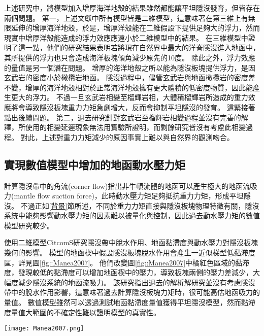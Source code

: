 上述研究中，將模型加入增厚海洋地殼的結果雖然都能讓平坦隱沒發育，但皆存在兩個問題。
第一，上述文獻中所有模型皆是二維模型，這意味著在第三維上有無限延伸的增厚海洋地殼，於是，增厚洋殼能在二維假設下提供足夠大的浮力，然而現實中增厚洋殼能造成的浮力效應應遠小於二維模型中的結果。
\citealp{florez2019impact}在三維模型中證明了這一點，他們的研究結果表明若將現在自然界中最大的洋脊隱沒進入地函中，其所提供的浮力也只會造成海洋板塊傾角減少原先的10度。
除此之外，浮力效應的量值是另一個潛在問題。
增厚的海洋地殼之所以能為隱沒板塊提供浮力，是因玄武岩的密度小於橄欖岩地函。
隱沒過程中，儘管玄武岩與地函橄欖岩的密度差不變，增厚的海洋地殼相對於正常海洋地殼擁有更大體積的低密度物質，因此能產生更大的浮力。
不過一旦玄武岩相變至榴輝岩相，大體積榴輝岩所造成的重力效應將會導致隱沒板塊重力力矩急劇增大，反而會抑制平坦隱沒的發育。
這緊接著點出後續問題。
第二，過去研究針對玄武岩至榴輝岩相變過程並沒有完善的解釋，\citealp{van2002role}所使用的相變延遲現象無法用實驗所證明，而剩餘研究皆沒有考慮此相變過程。
對此，上述對重力力矩減少的原因事實上難以與自然界的觀測吻合。


\subsection{實現數值模型中增加的地函動水壓力矩}
\citealp{tovish1978mantle}計算隱沒帶中的角流(corner flow)指出非牛頓流體的地函可以產生極大的地函流吸力(mantle flow suction force)，此時動水壓力矩足夠抵抗重力力矩，形成平坦隱沒。
不過正如\ref{背景}節所述，不同於重力力矩直接與隱沒板塊物理特徵有關，隱沒系統中能夠影響動水壓力矩的因素難以被量化與控制，因此過去動水壓力矩的數值模型研究較少。

\citealp{Manea2007}使用二維模型CitcomS研究隱沒帶中脫水作用、地函黏滯度與動水壓力對隱沒板塊幾何的影響。
模型的地函楔中假設隱沒板塊脫水作用會產生一近似梯型低黏滯度區，詳見圖\ref{fig::Manea2007}。
他們改變圖\ref{fig::Manea2007}中橘紅色區域的黏滯度，發現較低的黏滯度可以增加地函楔中的壓力，導致板塊兩側的壓力差減少，大幅度減少隱沒系統的地函流吸力。
該研究指出過去\citealp{tovish1978mantle}的解析解研究並沒有考慮隱沒帶中的脫水作用影響，這意味著過去計算隱沒板塊力矩時，很可能高估地函吸力的量值。
數值模型雖然可以透過測試地函黏滯度量值獲得平坦隱沒模型，然而黏滯度量值大範圍的不確定性難以證明模型的真實性。

\begin{figure*}[ht!]
    \centering
    \texttt{[image: Manea2007.png]}
    \caption[\citealp{Manea2007}模型中所設定的低黏滯度近似梯形區與低黏滯度通道區域]{\citealp{Manea2007}模型中所設定的低黏滯度近似梯形區與低黏滯度通道區域，表示隱沒帶的脫水作用對地函楔造成的影響。}
    \label{fig::Manea2007}
\end{figure*}

